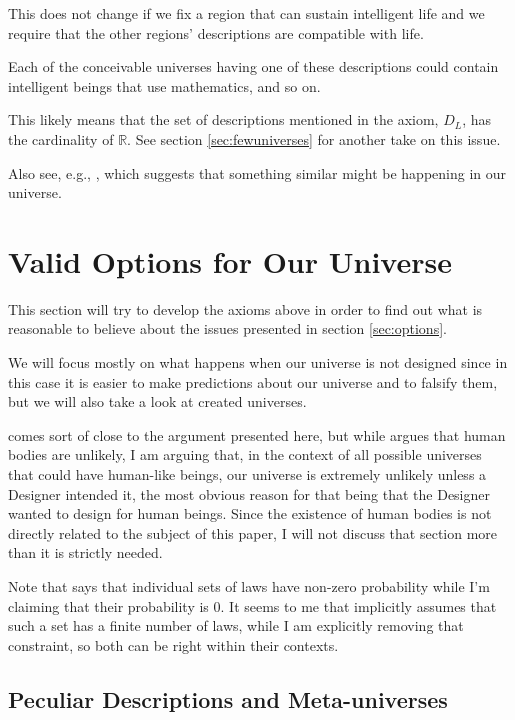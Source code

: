 \documentclass[a4paper
,draft
]{article}
\def\reale{\mathbb{R}}
\def\descriptions{D_L}
\newcommand{\paper}[1]{paper}
\newcommand{\ghilimele}[1]{``#1"}
\begin{document}
This does not change if we fix a region that can sustain intelligent life
and we require that the other regions' descriptions are compatible with life.

Each of the conceivable universes
having one of these descriptions could contain intelligent beings that use
mathematics, and so on.

This likely means that the set of descriptions mentioned in the axiom,
$\descriptions$, has the cardinality of $\reale$. See section
\ref{sec:fewuniverses} for another take on this issue.

Also see, e.g., \parencite{Manson2003}, which suggests that something similar
might be happening in our universe.

\section{Valid Options for Our Universe}
\label{sec:valid-options}

This section will try to develop the axioms above in order to find out what
is reasonable to believe about the issues presented in
section \ref{sec:options}.

We will focus mostly on what happens when our universe is not designed
since in this case it is easier to make predictions about our universe
and to falsify them, but we will also take a look at created universes.

\textcite[][Section \ghilimele{Why a world with human bodies is unlikely
if there is no God}]{Swinburne2003} comes sort of close to the argument
presented here, but while \citeauthor{Swinburne2003}
argues that human bodies are unlikely, I am arguing that, in the context
of all possible universes that could have human-like beings,
our universe is extremely unlikely unless a Designer intended it, the most
obvious reason for that being that the Designer wanted to design for human
beings.
Since the existence of human bodies is not directly related to the subject
of this \paper{}, I will not discuss that section more
than it is strictly needed.

Note that  \citeauthor{Swinburne2003} says that individual sets of laws
have non-zero probability while I'm claiming that their probability is $0$.
It seems to me that \citeauthor{Swinburne2003} implicitly assumes that
such a set has a finite number of laws, while I am explicitly removing
that constraint, so both can be right within their contexts.

\subsection{Peculiar Descriptions and Meta-universes}
\label{fdaumu}
\end{document}
